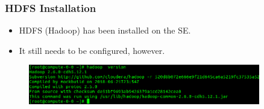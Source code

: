 \documentclass{beamer}
\begin{document}
\begin{frame}
  \frametitle{HDFS Installation}

  \begin{itemize}
  \item HDFS (Hadoop) has been installed on the SE.
  \item It still needs to be configured, however.
  \end{itemize}

  \begin{figure}[H]
    \begin{center}
      \includegraphics[width=0.9\textwidth]{hadoop_version.png}
    \end{center}
   \end{figure}
  
\end{frame}
\end{document}

